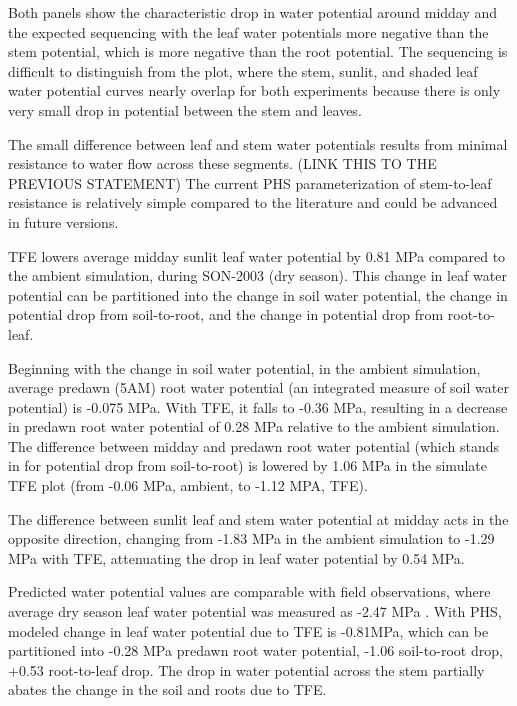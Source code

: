\documentclass[draft,linenumbers]{agujournal}
\begin{document}
    Both panels show the characteristic drop in water potential around midday and the expected sequencing with the leaf water potentials more negative than the stem potential, which is more negative than the root potential. The sequencing is difficult to distinguish from the plot, where the stem, sunlit, and shaded leaf water potential curves nearly overlap for both experiments because there is only very small drop in potential between the stem and leaves. 
    
    The small difference between leaf and stem water potentials results from minimal resistance to water flow across these segments. (LINK THIS TO THE PREVIOUS STATEMENT) The current PHS parameterization of stem-to-leaf resistance is relatively simple compared to the literature \citep{franks2007} and could be advanced in future versions. 
    
    TFE lowers average midday sunlit leaf water potential by 0.81 MPa compared to the ambient simulation, during SON-2003 (dry season). This change in leaf water potential can be partitioned into the change in soil water potential, the change in potential drop from soil-to-root, and the change in potential drop from root-to-leaf. 
    
    Beginning with the change in soil water potential, in the ambient simulation, average predawn (5AM) root water potential (an integrated measure of soil water potential) is -0.075 MPa. With TFE, it falls to -0.36 MPa, resulting in a decrease in predawn root water potential of 0.28 MPa relative to the ambient simulation. The difference between midday and predawn root water potential (which stands in for potential drop from soil-to-root) is lowered by 1.06 MPa in the simulate TFE plot (from -0.06 MPa, ambient, to -1.12 MPA, TFE).
    
    The difference between sunlit leaf and stem water potential at midday acts in the opposite direction, changing from -1.83 MPa in the ambient simulation to -1.29 MPa with TFE, attenuating the drop in leaf water potential by 0.54 MPa.
    
    Predicted water potential values are comparable with field observations, where average dry season leaf water potential was measured as -2.47 MPa \citep{fisher2006}. With PHS, modeled change in leaf water potential due to TFE is -0.81MPa, which can be partitioned into -0.28 MPa predawn root water potential, -1.06 soil-to-root drop, +0.53 root-to-leaf drop. The drop in water potential across the stem partially abates the change in the soil and roots due to TFE. 
    
\end{document}
